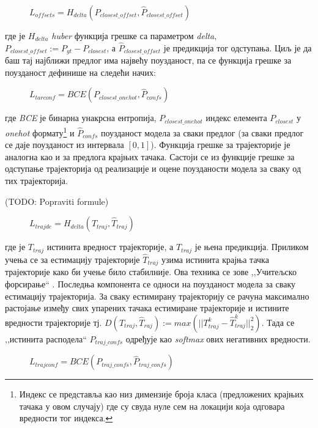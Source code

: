 \documentclass[11pt,oneside]{memoir}
\begin{document}
\begin{figure}[H]
  \centering
  $L_{offsets} = H_{delta}(P_{closest\_offset}, \hat{P}_{closest\_offset})$
\end{figure}

\noindent где је $H_{delta}$ \textit{huber} функција грешке са параметром \textit{delta}, $P_{closest\_offset} := P_{gt} - P_{closest}$,
а $\hat{P}_{closest\_offset}$ је предикција тог одступања. Циљ је да баш тај најближи предлог има највећу поузданост, па се функција грешке за 
поузданост дефинише на следећи начих:

\begin{figure}[H]
  \centering
  $L_{tarconf} = BCE(P_{closest\_onehot}, \hat{P}_{confs})$
\end{figure}

\noindent где \textit{BCE} је бинарна унакрсна ентропија, $P_{closest\_onehot}$ индекс елемента $P_{closest}$ у \textit{onehot} 
формату\footnote{Индекс се представља као низ димензије броја класа (предложених крајњих тачака у овом случају) где су свуда нуле сем на локацији која одговара
вредности тог индекса.} и $\hat{P}_{confs}$ поузданост модела за сваки предлог (за сваки предлог се даје поузданост из интервала $[0, 1]$). Функција грешке за
трајекторије је аналогна као и за предлога крајњих тачака. Састоји се из функције грешке за одступање трајекторија од реализације и оцене
поузданости модела за сваку од тих трајекторија.

(TODO: Popraviti formule)
\begin{figure}[H]
  \centering
  $L_{trajde} = H_{delta} (T_{traj}, \hat{T}_{traj})$
\end{figure}

\noindent где је $T_{traj}$ истинита вредност трајекторије, а $\hat{T}_{traj}$ је њена предикција. Приликом учења се за естимацију трајекторије 
$\hat{T}_{traj}$ узима истинита крајња тачка трајекторије како би учење било стабилније. Ова техника се зове ,,Учитељско форсирање`` \cite{teacher_forcing}.
Последња компонента се односи на поузданост модела за сваку естимацију трајекторија. За сваку естимирану трајекторију се рачуна максимално растојање 
између свих упарених тачака естимиране трајекторије и истините вредности трајекторије тј. 
$D(T_{traj}, \hat{T}_{raj}) := max(||T^{k}_{traj} - \hat{T}^{k}_{traj}||^{2}_{2})$. Тада се ,,истинита расподела`` $P_{traj\_confs}$ одређује као \textit{softmax} 
ових негативних вредности.

\begin{figure}[H]
  \centering
  $L_{trajconf} = BCE(P_{traj\_confs}, \hat{P}_{traj\_confs})$
\end{figure}
\end{document}
